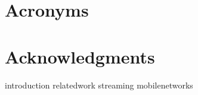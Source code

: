 \documentclass[openright,titlepage,numbers=noenddot,headinclude,footinclude=true,cleardoublepage=empty,BCOR=5mm,paper=a4,fontsize=11pt,]{scrreprt}
\begin{document}




\newpage
{}
\tableofcontents
\chapter*{Acronyms}

\listoffigures
\listoftables

\cleardoublepage


\cleardoublepage


\newtheorem{mydef}{Definition}
\cleardoublepage
\chapter*{Acknowledgments}

\cleardoublepage
{}
\pagestyle{plain}

{introduction}
{relatedwork}
{streaming}
{mobilenetworks}





\nocite{*}



\begingroup
\RaggedRight
\printbibliography
\endgroup

\end{document}
